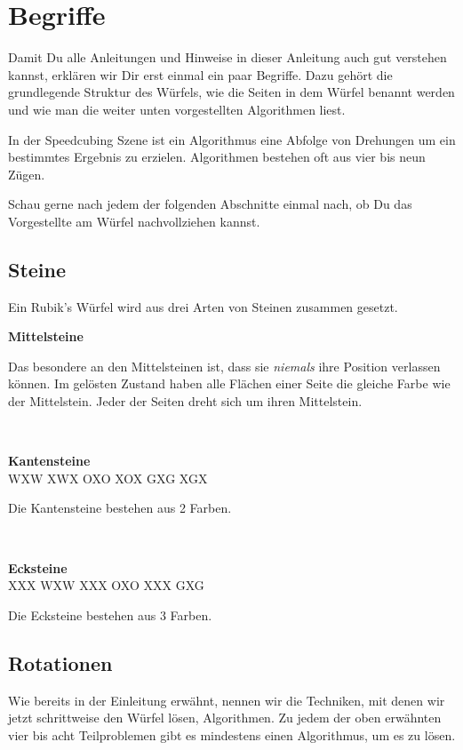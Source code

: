 \section{Begriffe}
Damit Du alle Anleitungen und Hinweise in dieser Anleitung auch gut verstehen kannst, erklären wir Dir erst einmal ein paar Begriffe.
Dazu gehört die grundlegende Struktur des Würfels, wie die Seiten in dem Würfel benannt werden und wie man die weiter unten vorgestellten Algorithmen liest.

In der Speedcubing Szene ist ein Algorithmus eine Abfolge von Drehungen um ein bestimmtes Ergebnis zu erzielen.
Algorithmen bestehen oft aus vier bis neun Zügen.

Schau gerne nach jedem der folgenden Abschnitte einmal nach, ob Du das Vorgestellte am Würfel nachvollziehen kannst.

\subsection{Steine}

Ein Rubik's Würfel wird aus drei Arten von Steinen zusammen gesetzt. \\[1em]
\parbox{0.3\linewidth}{
  \centering
  \textbf{Mittelsteine}\\[1em] \RubikCubeGreyWY{}
}
\parbox{0.7\linewidth}{
Das besondere an den Mittelsteinen ist, dass sie \emph{niemals} ihre Position verlassen können.
Im gelösten Zustand haben alle Flächen einer Seite die gleiche Farbe wie der Mittelstein.
Jeder der Seiten dreht sich um ihren Mittelstein.
}\\[1em]
\parbox{0.3\linewidth}{
  \centering
  \textbf{Kantensteine}\\[1em]
  \RubikCubeGreyAll%
	{W}{X}{W}
	{X}{W}{X}%
	   {O}{X}{O}
	   {X}{O}{X}%
	   {G}{X}{G}
	   {X}{G}{X}%
}
\parbox{0.7\linewidth}{
  Die Kantensteine bestehen aus 2 Farben.
}\\[1em]
\parbox{0.3\linewidth}{
  \centering
  \textbf{Ecksteine}\\[1em]
  \RubikCubeGreyAll%
	{X}{X}{X}
	{W}{X}{W}%
	   {X}{X}{X}
	   {O}{X}{O}%
	   {X}{X}{X}
	   {G}{X}{G}%
}
\parbox{0.7\linewidth}{
  Die Ecksteine bestehen aus 3 Farben.
}

\subsection{Rotationen}
Wie bereits in der Einleitung erwähnt, nennen wir die Techniken, mit denen wir jetzt schrittweise den Würfel lösen, Algorithmen.
Zu jedem der oben erwähnten vier bis acht Teilproblemen gibt es mindestens einen Algorithmus, um es zu lösen.

